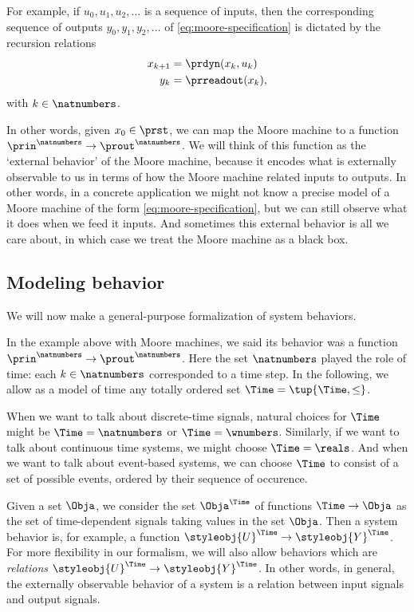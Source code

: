 For example, if $u_0, u_1, u_2, ... $ is a sequence of inputs, then the corresponding sequence of outputs $y_0, y_1, y_2, ... $ of \cref{eq:moore-specification} is dictated by the recursion relations
\begin{align}
x_{k+1} &= \prdyn(x_k, u_k) \label{eq:state-recursion} \\
y_{k} &= \prreadout(x_{k}),
\end{align}
with $k \in \natnumbers$. 

In other words, given $x_0 \in \prst$, we can map the Moore machine \label{eq:moore-again} to a function $\prin^\natnumbers \to \prout^\natnumbers$. We will think of this function as the `external behavior' of the Moore machine, because it encodes what is externally observable to us in terms of how the Moore machine related inputs to outputs. In other words, in a concrete application we might not know a precise model of a Moore machine of the form \cref{eq:moore-specification}, but we can still observe what it does when we feed it inputs. And sometimes this external behavior is all we care about, in which case we treat the Moore machine as a black box. 

\subsection{Modeling behavior}

We will now make a general-purpose formalization of system behaviors. 

In the example above with Moore machines, we said its behavior was a function $\prin^\natnumbers \to \prout^\natnumbers$. Here the set $\natnumbers$ played the role of time: each $k \in \natnumbers$ corresponded to a time step. In the following, we allow as a model of time any totally ordered set $\Time = \tup{\Time, \leq}$. 

When we want to talk about discrete-time signals, natural choices for $\Time$ might be $\Time = \natnumbers$ or $\Time = \wnumbers$. Similarly, if we want to talk about continuous time systems, we might choose $\Time = \reals$.
And when we want to talk about event-based systems, we can choose $\Time$ to consist of a set of possible events, ordered by their sequence of occurence.


Given a set $\Obja$, we consider the set $\Obja^\Time$ of functions $\Time \to \Obja$ as the set of time-dependent signals taking values in the set $\Obja$. Then a system behavior is, for example, a function $\styleobj{U}^\Time \to \styleobj{Y}^\Time$. For more flexibility in our formalism, we will also allow behaviors which are \emph{relations} $\styleobj{U}^\Time \to \styleobj{Y}^\Time$. 
In other words, in general, the externally observable behavior of a system is a relation between input signals and output signals.

